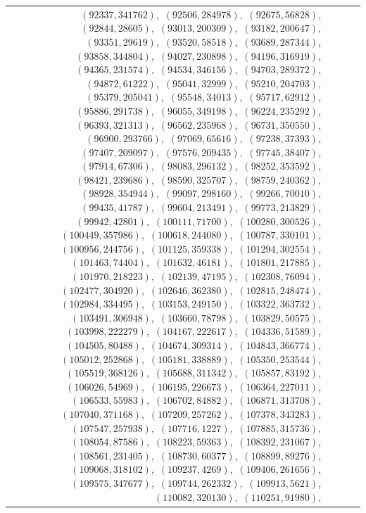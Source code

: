 \documentclass[11pt]{article}
\begin{document}
\begin{longtable}{@{}rrl>{\raggedright\arraybackslash}p{}@{}}
$(92337,341762)$,\allowbreak\ $(92506,284978)$,\allowbreak\ $(92675,56828)$,\allowbreak\ $(92844,28605)$,\allowbreak\ $(93013,200309)$,\allowbreak\ $(93182,200647)$,\allowbreak\ $(93351,29619)$,\allowbreak\ $(93520,58518)$,\allowbreak\ $(93689,287344)$,\allowbreak\ $(93858,344804)$,\allowbreak\ $(94027,230898)$,\allowbreak\ $(94196,316919)$,\allowbreak\ $(94365,231574)$,\allowbreak\ $(94534,346156)$,\allowbreak\ $(94703,289372)$,\allowbreak\ $(94872,61222)$,\allowbreak\ $(95041,32999)$,\allowbreak\ $(95210,204703)$,\allowbreak\ $(95379,205041)$,\allowbreak\ $(95548,34013)$,\allowbreak\ $(95717,62912)$,\allowbreak\ $(95886,291738)$,\allowbreak\ $(96055,349198)$,\allowbreak\ $(96224,235292)$,\allowbreak\ $(96393,321313)$,\allowbreak\ $(96562,235968)$,\allowbreak\ $(96731,350550)$,\allowbreak\ $(96900,293766)$,\allowbreak\ $(97069,65616)$,\allowbreak\ $(97238,37393)$,\allowbreak\ $(97407,209097)$,\allowbreak\ $(97576,209435)$,\allowbreak\ $(97745,38407)$,\allowbreak\ $(97914,67306)$,\allowbreak\ $(98083,296132)$,\allowbreak\ $(98252,353592)$,\allowbreak\ $(98421,239686)$,\allowbreak\ $(98590,325707)$,\allowbreak\ $(98759,240362)$,\allowbreak\ $(98928,354944)$,\allowbreak\ $(99097,298160)$,\allowbreak\ $(99266,70010)$,\allowbreak\ $(99435,41787)$,\allowbreak\ $(99604,213491)$,\allowbreak\ $(99773,213829)$,\allowbreak\ $(99942,42801)$,\allowbreak\ $(100111,71700)$,\allowbreak\ $(100280,300526)$,\allowbreak\ $(100449,357986)$,\allowbreak\ $(100618,244080)$,\allowbreak\ $(100787,330101)$,\allowbreak\ $(100956,244756)$,\allowbreak\ $(101125,359338)$,\allowbreak\ $(101294,302554)$,\allowbreak\ $(101463,74404)$,\allowbreak\ $(101632,46181)$,\allowbreak\ $(101801,217885)$,\allowbreak\ $(101970,218223)$,\allowbreak\ $(102139,47195)$,\allowbreak\ $(102308,76094)$,\allowbreak\ $(102477,304920)$,\allowbreak\ $(102646,362380)$,\allowbreak\ $(102815,248474)$,\allowbreak\ $(102984,334495)$,\allowbreak\ $(103153,249150)$,\allowbreak\ $(103322,363732)$,\allowbreak\ $(103491,306948)$,\allowbreak\ $(103660,78798)$,\allowbreak\ $(103829,50575)$,\allowbreak\ $(103998,222279)$,\allowbreak\ $(104167,222617)$,\allowbreak\ $(104336,51589)$,\allowbreak\ $(104505,80488)$,\allowbreak\ $(104674,309314)$,\allowbreak\ $(104843,366774)$,\allowbreak\ $(105012,252868)$,\allowbreak\ $(105181,338889)$,\allowbreak\ $(105350,253544)$,\allowbreak\ $(105519,368126)$,\allowbreak\ $(105688,311342)$,\allowbreak\ $(105857,83192)$,\allowbreak\ $(106026,54969)$,\allowbreak\ $(106195,226673)$,\allowbreak\ $(106364,227011)$,\allowbreak\ $(106533,55983)$,\allowbreak\ $(106702,84882)$,\allowbreak\ $(106871,313708)$,\allowbreak\ $(107040,371168)$,\allowbreak\ $(107209,257262)$,\allowbreak\ $(107378,343283)$,\allowbreak\ $(107547,257938)$,\allowbreak\ $(107716,1227)$,\allowbreak\ $(107885,315736)$,\allowbreak\ $(108054,87586)$,\allowbreak\ $(108223,59363)$,\allowbreak\ $(108392,231067)$,\allowbreak\ $(108561,231405)$,\allowbreak\ $(108730,60377)$,\allowbreak\ $(108899,89276)$,\allowbreak\ $(109068,318102)$,\allowbreak\ $(109237,4269)$,\allowbreak\ $(109406,261656)$,\allowbreak\ $(109575,347677)$,\allowbreak\ $(109744,262332)$,\allowbreak\ $(109913,5621)$,\allowbreak\ $(110082,320130)$,\allowbreak\ $(110251,91980)$,\allowbreak\ 
\end{longtable}
\end{document}
